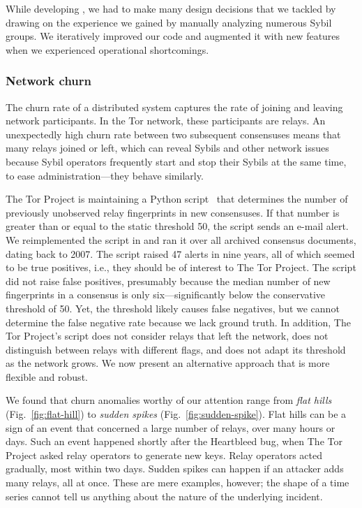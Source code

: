 While developing \sys, we had to make many design decisions that we
tackled by drawing on the experience we gained by manually analyzing numerous
Sybil groups.  We iteratively improved our code and augmented it with new
features when we experienced operational shortcomings.

\subsubsection{Network churn}
\label{sec:churn-time-series}
The churn rate of a distributed system captures the rate of joining and leaving
network participants.  In the Tor network, these participants are relays.  An
unexpectedly high churn rate between two subsequent consensuses means that many
relays joined or left, which can reveal Sybils and other network issues because
Sybil operators frequently start and stop their Sybils at the same time, to ease
administration---they behave similarly.

The Tor Project is maintaining a Python script~\cite{doctor} that determines the
number of previously unobserved relay fingerprints in new consensuses.  If that
number is greater than or equal to the static threshold 50, the script sends an
e-mail alert.  We reimplemented the script in \sys and ran it over all archived
consensus documents, dating back to 2007.  The script raised 47 alerts in nine
years, all of which seemed to be true positives, i.e., they should be of
interest to The Tor Project.  The script did not raise false positives,
presumably because the median number of new fingerprints in a consensus is only
six---significantly below the conservative threshold of 50.  Yet, the threshold
likely causes false negatives, but we cannot determine the false negative rate
because we lack ground truth.  In addition, The Tor Project's script does not
consider relays that left the network, does not distinguish between relays with
different flags, and does not adapt its threshold as the network grows.  We now
present an alternative approach that is more flexible and robust.

We found that churn anomalies worthy of our attention range from \emph{flat
hills} (Fig.~\ref{fig:flat-hill}) to \emph{sudden spikes}
(Fig.~\ref{fig:sudden-spike}).  Flat hills can be a sign of an event that
concerned a large number of relays, over many hours or days.  Such an event
happened shortly after the Heartbleed bug, when The Tor Project asked relay
operators to generate new keys.  Relay operators acted gradually, most within
two days.  Sudden spikes can happen if an attacker adds many relays, all at
once.  These are mere examples, however; the shape of a time series cannot tell
us anything about the nature of the underlying incident.


